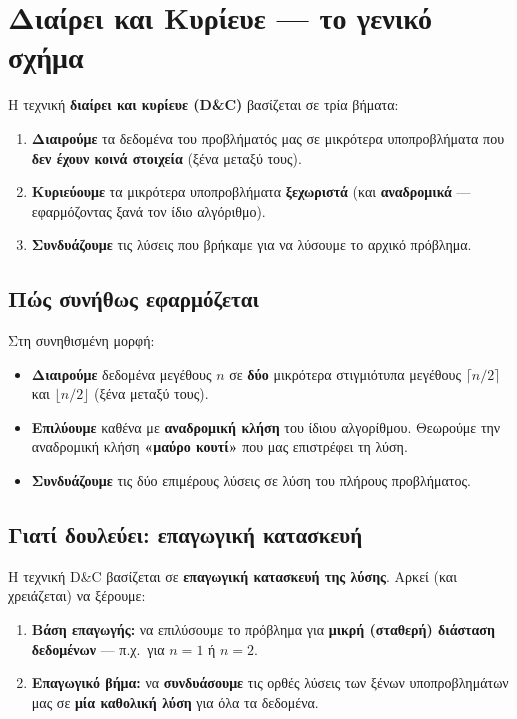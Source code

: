 \documentclass[11pt,a4paper]{article}
\begin{document}
\section{Διαίρει και Κυρίευε --- το γενικό σχήμα}

Η τεχνική \textbf{διαίρει και κυρίευε (D\&C)} βασίζεται σε τρία βήματα:

\begin{enumerate}
  \item \textbf{Διαιρούμε} τα δεδομένα του προβλήματός μας σε μικρότερα
  υποπροβλήματα που \textbf{δεν έχουν κοινά στοιχεία} (ξένα μεταξύ τους).
  \item \textbf{Κυριεύουμε} τα μικρότερα υποπροβλήματα \textbf{ξεχωριστά} (και
  \textbf{αναδρομικά} --- εφαρμόζοντας ξανά τον ίδιο αλγόριθμο).
  \item \textbf{Συνδυάζουμε} τις λύσεις που βρήκαμε για να λύσουμε το αρχικό
  πρόβλημα.
\end{enumerate}

\subsection{Πώς συνήθως εφαρμόζεται}

Στη συνηθισμένη μορφή:
\begin{itemize}
  \item \textbf{Διαιρούμε} δεδομένα μεγέθους $n$ σε \textbf{δύο} μικρότερα
  στιγμιότυπα μεγέθους $\lceil n/2 \rceil$ και $\lfloor n/2 \rfloor$ (ξένα μεταξύ
  τους).
  \item \textbf{Επιλύουμε} καθένα με \textbf{αναδρομική κλήση} του ίδιου
  αλγορίθμου. Θεωρούμε την αναδρομική κλήση \textbf{«μαύρο κουτί»} που μας
  επιστρέφει τη λύση.
  \item \textbf{Συνδυάζουμε} τις δύο επιμέρους λύσεις σε λύση του πλήρους
  προβλήματος.
\end{itemize}

\subsection{Γιατί δουλεύει: επαγωγική κατασκευή}

Η τεχνική D\&C βασίζεται σε \textbf{επαγωγική κατασκευή της λύσης}. Αρκεί (και
χρειάζεται) να ξέρουμε:
\begin{enumerate}
  \item \textbf{Βάση επαγωγής:} να επιλύσουμε το πρόβλημα για \textbf{μικρή
  (σταθερή) διάσταση δεδομένων} --- π.χ.\ για $n = 1$ ή $n = 2$.
  \item \textbf{Επαγωγικό βήμα:} να \textbf{συνδυάσουμε} τις ορθές λύσεις των
  ξένων υποπροβλημάτων μας σε \textbf{μία καθολική λύση} για όλα τα δεδομένα.
\end{enumerate}
\end{document}
